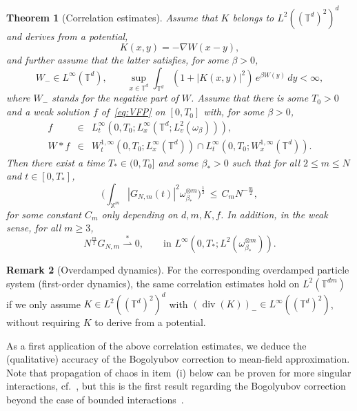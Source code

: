 \documentclass[a4paper,11pt,reqno,noindent]{amsart}
\theoremstyle{plain}
\newtheorem{theor}{Theorem}[section]
\theoremstyle{definition}
\newtheorem{rem}[theor]{Remark}
\numberwithin{equation}{section}
\newcommand{\Xd}{\mathbb X}
\newcommand{\T}{\mathbb T}
\newcommand{\Div}{{\operatorname{div}}}
\begin{document}
\begin{theor}[Correlation estimates]\label{th:main}
Assume that $K$ belongs to $L^2((\T^d)^2)^d$ and derives from a potential,
\[K(x,y)=-\nabla W(x-y),\]
and further assume that the latter satisfies, for some $\beta>0$,
\[W_-\in L^\infty(\T^d),\qquad \sup_{x\in\T^d}\int_{\T^d}(1+|K(x,y)|^2)\,e^{\beta W(y)}\,dy<\infty,\]
where $W_-$ stands for the negative part of $W$.
Assume that there is some $T_0>0$ and a weak solution $f$ of~\eqref{eq:VFP} on $[0,T_0]$ with, for some $\beta>0$,
\begin{eqnarray*}
f&\in& L^\infty_t(0,T_0;L^\infty_x(\T^d;L^2_v(\omega_\beta))),\\
W\ast f&\in& W^{1,\infty}_t(0,T_0;L^\infty_x(\T^d))\cap L^\infty_t(0,T_0;W^{1,\infty}_x(\T^d)).
\end{eqnarray*}
Then there exist a time $T_*\in(0,T_0]$ and some $\beta_*>0$ such that for all $2\le m\le N$ and $t\in[0,T_*]$,
\begin{equation}\label{eq:L2bnd}
\Big(\int_{\Xd^m}|G_{N,m}(t)|^2\omega_{\beta_*}^{\otimes m}\Big)^\frac12\,\le\, C_mN^{-\frac m2},
\end{equation}
for some constant $C_m$ only depending on $d,m,K,f$.
In addition, in the weak sense, for all $m\ge3$,
\begin{equation}\label{eq:wL2bnd}
N^{\frac m2}G_{N,m}\overset*\rightharpoonup0,\qquad\text{in $L^\infty(0,T_*;L^2(\omega_{\beta_*}^{\otimes m}))$}.
\end{equation}
\end{theor}

\begin{rem}[Overdamped dynamics]\label{rem:overdamped}
For the corresponding overdamped particle system (first-order dynamics), the same correlation estimates hold on $L^2(\T^{dm})$ if we only assume $K\in L^2((\T^d)^2)^d$ with $(\Div(K))_-\in L^\infty((\T^d)^2)$, without requiring $K$ to derive from a potential.
\end{rem}

As a first application of the above correlation estimates, we deduce the (qualitative) accuracy of the Bogolyubov correction to mean-field approximation. Note that propagation of chaos in item~(i) below can be proven for more singular interactions, cf.~\cite{BJS-22}, but this is the first result regarding the Bogolyubov correction beyond the case of bounded interactions~\cite{D-21,Hess_Childs_2023}.
\end{document}
